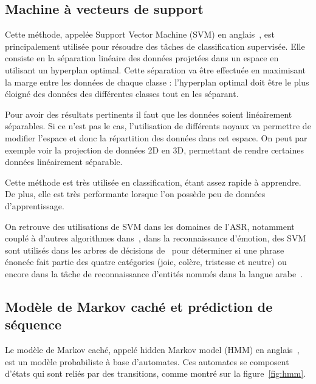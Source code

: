 \subsection{Machine à vecteurs de support}
Cette méthode, appelée Support Vector Machine (SVM) en anglais~\cite{Cortes1995}, est principalement utilisée pour résoudre des tâches de classification supervisée. Elle consiste en la séparation linéaire des données projetées dans un espace en utilisant un hyperplan optimal. Cette séparation va être effectuée en maximisant la marge entre les données de chaque classe : l'hyperplan optimal doit être le plus éloigné des données des différentes classes tout en les séparant.

Pour avoir des résultats pertinents il faut que les données soient linéairement séparables. Si ce n'est pas le cas, l'utilisation de différents noyaux va permettre de modifier l'espace et donc la répartition des données dans cet espace. On peut par exemple voir la projection de données 2D en 3D, permettant de rendre certaines données linéairement séparable.

Cette méthode est très utilisée en classification, étant assez rapide à apprendre. De plus, elle est très performante lorsque l'on possède peu de données d'apprentissage.

On retrouve des utilisations de SVM dans les domaines de l'ASR, notamment couplé à d'autres algorithmes dans~\cite{Solera2007}, dans la reconnaissance d'émotion, des SVM sont utilisés dans les arbres de décisions de~\cite{Rozgic2012} pour déterminer si une phrase énoncée fait partie des quatre catégories (joie, colère, tristesse et neutre) ou encore dans la tâche de reconnaissance d'entités nommés dans la langue arabe~\cite{Benajiba2008}.

\subsection{Modèle de Markov caché et prédiction de séquence}

Le modèle de Markov caché, appelé hidden Markov model (HMM) en anglais~\cite{Rabiner1986}, est un modèle probabiliste à base d'automates. Ces automates se composent d'états qui sont reliés par des transitions, comme montré sur la figure~\ref{fig:hmm}.

